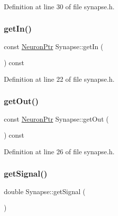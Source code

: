 Definition at line 30 of file synapse.\+h.

\mbox{\label{class_synapse_ac6f0d40b4c56391f6eaf17c062112089}} 
\subsubsection{\texorpdfstring{get\+In()}{getIn()}}
{\footnotesize\ttfamily const \hyperlink{neural_network_8h_af4884b0194f2598e689c894b76d0d92c}{Neuron\+Ptr} Synapse\+::get\+In (\begin{DoxyParamCaption}{ }\end{DoxyParamCaption}) const\hspace{0.3cm}{\ttfamily [inline]}}



Definition at line 22 of file synapse.\+h.

\mbox{\label{class_synapse_a98bb7ae4e2b75edfd07f1366cba6cc80}} 
\subsubsection{\texorpdfstring{get\+Out()}{getOut()}}
{\footnotesize\ttfamily const \hyperlink{neural_network_8h_af4884b0194f2598e689c894b76d0d92c}{Neuron\+Ptr} Synapse\+::get\+Out (\begin{DoxyParamCaption}{ }\end{DoxyParamCaption}) const\hspace{0.3cm}{\ttfamily [inline]}}



Definition at line 26 of file synapse.\+h.

\mbox{\label{class_synapse_af46174272161c65aa44279c92f8e625b}} 
\subsubsection{\texorpdfstring{get\+Signal()}{getSignal()}}
{\footnotesize\ttfamily double Synapse\+::get\+Signal (\begin{DoxyParamCaption}{ }\end{DoxyParamCaption})}




